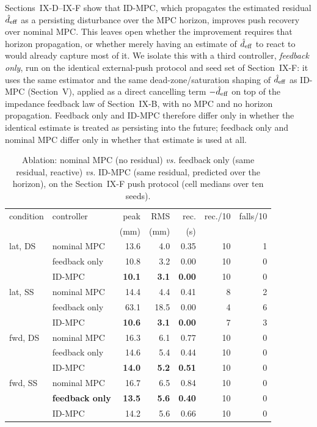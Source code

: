\documentclass[journal]{IEEEtran}
\theoremstyle{plain}
\theoremstyle{definition}
\theoremstyle{remark}
\newcommand{\deff}{d_{\rm eff}}
\begin{document}
Sections~IX-D--IX-F show that ID-MPC, which propagates the estimated residual $\hat \deff$ as a persisting disturbance over the MPC horizon, improves push recovery over nominal MPC. This leaves open whether the improvement requires that horizon propagation, or whether merely having an estimate of $\hat \deff$ to react to would already capture most of it. We isolate this with a third controller, \emph{feedback only}, run on the identical external-push protocol and seed set of Section~IX-F: it uses the same estimator and the same dead-zone/saturation shaping of $\hat \deff$ as ID-MPC (Section~V), applied as a direct cancelling term $-\hat \deff$ on top of the impedance feedback law of Section~IX-B, with no MPC and no horizon propagation. Feedback only and ID-MPC therefore differ only in whether the identical estimate is treated as persisting into the future; feedback only and nominal MPC differ only in whether that estimate is used at all.

\begin{table}[t]
\centering
\caption{Ablation: nominal MPC (no residual) \emph{vs.} feedback only (same residual, reactive) \emph{vs.} ID-MPC (same residual, predicted over the horizon), on the Section~IX-F push protocol (cell medians over ten seeds).}
\label{tab:ablation}
\begin{tabular}{@{}llrrrrr@{}}
\toprule
condition & controller & peak & RMS & rec. & rec./10 & falls/10\\
 & & (mm) & (mm) & (s) & & \\
\midrule
lat, DS & nominal MPC & 13.6 & 4.0 & 0.35 & 10 & 1\\
 & feedback only & 10.8 & 3.2 & 0.00 & 10 & 0\\
 & ID-MPC & \textbf{10.1} & \textbf{3.1} & \textbf{0.00} & 10 & 0\\
lat, SS & nominal MPC & 14.4 & 4.4 & 0.41 & 8 & 2\\
 & feedback only & 63.1 & 18.5 & 0.00 & 4 & 6\\
 & ID-MPC & \textbf{10.6} & \textbf{3.1} & \textbf{0.00} & 7 & 3\\
fwd, DS & nominal MPC & 16.3 & 6.1 & 0.77 & 10 & 0\\
 & feedback only & 14.6 & 5.4 & 0.44 & 10 & 0\\
 & ID-MPC & \textbf{14.0} & \textbf{5.2} & \textbf{0.51} & 10 & 0\\
fwd, SS & nominal MPC & 16.7 & 6.5 & 0.84 & 10 & 0\\
 & \textbf{feedback only} & \textbf{13.5} & \textbf{5.6} & \textbf{0.40} & 10 & 0\\
 & ID-MPC & 14.2 & 5.6 & 0.66 & 10 & 0\\
\bottomrule
\end{tabular}
\end{table}
\end{document}
